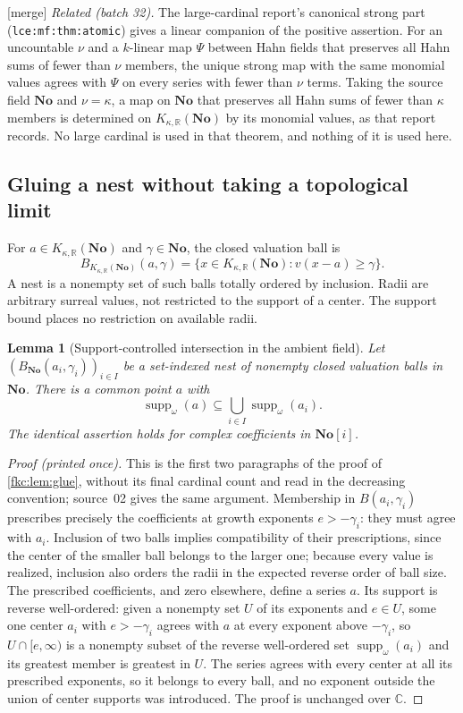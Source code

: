 \documentclass[11pt,letterpaper]{article}
\numberwithin{equation}{section}
\newtheorem{lemma}[theorem]{Lemma}
\theoremstyle{definition}
\theoremstyle{remark}
\newcommand{\R}{\mathbb R}
\newcommand{\C}{\mathbb C}
\newcommand{\No}{\mathbf{No}}
\newcommand{\mergetag}{\textup{\textsf{\small[merge]}}}%
\newcommand{\SC}{\mathbf{No}[i]}
\newcommand{\suppw}{\operatorname{supp}_{\omega}}
\newcommand{\KN}[2]{K_{#1,#2}(\No)}%
\newcommand{\lbl}[1]{\nolinkurl{#1}}%
\begin{document}
\mergetag{} \emph{Related (batch 32).} The large-cardinal report's canonical strong part (\lbl{lce:mf:thm:atomic}) gives a linear companion of the positive assertion. For an uncountable $\nu$ and a $k$-linear map $\Psi$ between Hahn fields that preserves all Hahn sums of fewer than $\nu$ members, the unique strong map with the same monomial values agrees with $\Psi$ on every series with fewer than $\nu$ terms. Taking the source field $\No$ and $\nu=\kappa$, a map on $\No$ that preserves all Hahn sums of fewer than $\kappa$ members is determined on $\KN\kappa\R$ by its monomial values, as that report records. No large cardinal is used in that theorem, and nothing of it is used here.

\subsection{Gluing a nest without taking a topological limit}
For $a\in\KN\kappa\R$ and $\gamma\in\No$, the closed valuation ball is
\[
 B_{\KN\kappa\R}(a,\gamma)
   =\{x\in\KN\kappa\R:v(x-a)\ge\gamma\}.
\]
A nest is a nonempty set of such balls totally ordered by inclusion. Radii are arbitrary surreal values, not restricted to the support of a center. The support bound places no restriction on available radii.

\begin{lemma}[Support-controlled intersection in the ambient field]\label{fkc:sb:lem:glue}
Let $(B_{\No}(a_i,\gamma_i))_{i\in I}$ be a set-indexed nest of nonempty closed valuation balls in $\No$. There is a common point $a$ with
\[
 \suppw(a)\subseteq\bigcup_{i\in I}\suppw(a_i).
\]
The identical assertion holds for complex coefficients in $\SC$.
\end{lemma}
\begin{proof}[Proof \textup{(printed once)}]
This is the first two paragraphs of the proof of \cref{fkc:lem:glue}, without its final cardinal count and read in the decreasing convention; source~02 gives the same argument. Membership in $B(a_i,\gamma_i)$ prescribes precisely the coefficients at growth exponents $e>-\gamma_i$: they must agree with $a_i$. Inclusion of two balls implies compatibility of their prescriptions, since the center of the smaller ball belongs to the larger one; because every value is realized, inclusion also orders the radii in the expected reverse order of ball size. The prescribed coefficients, and zero elsewhere, define a series $a$. Its support is reverse well-ordered: given a nonempty set $U$ of its exponents and $e\in U$, some one center $a_i$ with $e>-\gamma_i$ agrees with $a$ at every exponent above $-\gamma_i$, so $U\cap[e,\infty)$ is a nonempty subset of the reverse well-ordered set $\suppw(a_i)$ and its greatest member is greatest in $U$. The series agrees with every center at all its prescribed exponents, so it belongs to every ball, and no exponent outside the union of center supports was introduced. The proof is unchanged over $\C$.
\end{proof}
\end{document}

